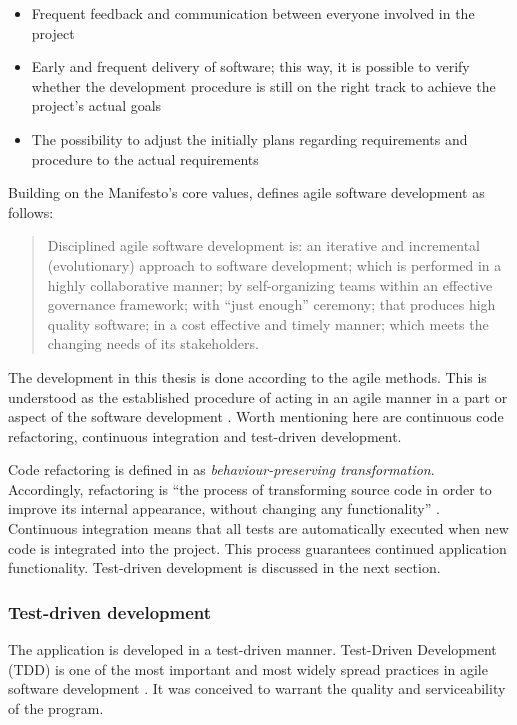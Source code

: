 \begin{itemize}
  \item Frequent feedback and communication between everyone involved in the project
  \item Early and frequent delivery of software; this way, it is possible to verify whether the development procedure is still on the right track to achieve the project's actual goals
  \item The possibility to adjust the initially plans regarding requirements and procedure to the actual requirements
\end{itemize}

Building on the Manifesto's core values, \cite{agile:definition} defines agile software development as follows:

\begin{quote}
Disciplined agile software development is: an iterative and incremental (evolutionary) approach to software development; which is performed in a highly collaborative manner; by self-organizing teams within an effective governance framework; with \enquote{just enough} ceremony; that produces high quality software; in a cost effective and timely manner; which meets the changing needs of its stakeholders. 
\end{quote}

The development in this thesis is done according to the agile methods. This is understood as the established procedure of acting in an agile manner in a part or aspect of the software development . Worth mentioning here are continuous code refactoring, continuous integration and test-driven development.

Code refactoring is defined in  as \textit{behaviour-preserving transformation}. Accordingly, refactoring is \enquote{the process of transforming source code in order to improve its internal appearance, without changing any functionality} . Continuous integration means that all tests are automatically executed when new code is integrated into the project. This process guarantees continued application functionality. Test-driven development is discussed in the next section.


\subsubsection{Test-driven development}
\label{subsec:tdd}

The application is developed in a test-driven manner. Test-Driven Development (TDD) is one of the most important and most widely spread practices in agile software development . It was conceived to warrant the quality and serviceability of the program.

